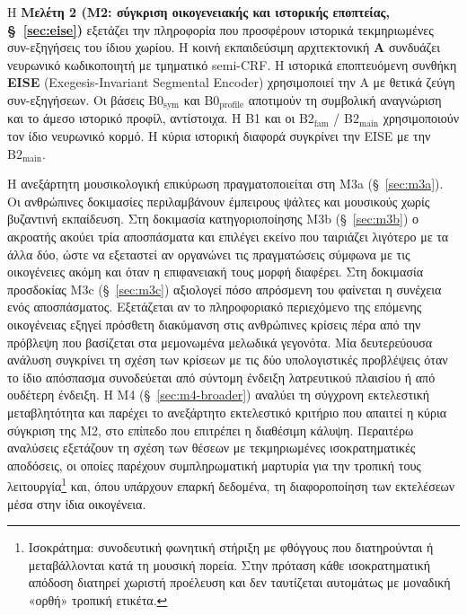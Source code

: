 \documentclass[11pt,a4paper]{article}
\begin{document}
Η \textbf{Μελέτη 2 (M2: σύγκριση οικογενειακής και ιστορικής εποπτείας, §~\ref{sec:eise})} εξετάζει την πληροφορία που προσφέρουν ιστορικά τεκμηριωμένες συν-εξηγήσεις του ίδιου χωρίου. Η κοινή εκπαιδεύσιμη αρχιτεκτονική \textbf{A} συνδυάζει νευρωνικό κωδικοποιητή με τμηματικό semi-CRF. Η ιστορικά εποπτευόμενη συνθήκη \textbf{EISE} (Exegesis-Invariant Segmental Encoder) χρησιμοποιεί την Α με θετικά ζεύγη συν-εξηγήσεων. Οι βάσεις $\mathrm{B0}_{\mathrm{sym}}$ και $\mathrm{B0}_{\mathrm{profile}}$ αποτιμούν τη συμβολική αναγνώριση και το άμεσο ιστορικό προφίλ, αντίστοιχα. Η B1 και οι $\mathrm{B2}_{\mathrm{fam}}$ / $\mathrm{B2}_{\mathrm{main}}$ χρησιμοποιούν τον ίδιο νευρωνικό κορμό. Η κύρια ιστορική διαφορά συγκρίνει την EISE με την $\mathrm{B2}_{\mathrm{main}}$.

Η ανεξάρτητη μουσικολογική επικύρωση πραγματοποιείται στη M3a (§~\ref{sec:m3a}). Οι ανθρώπινες δοκιμασίες περιλαμβάνουν έμπειρους ψάλτες και μουσικούς χωρίς βυζαντινή εκπαίδευση. Στη δοκιμασία κατηγοριοποίησης M3b (§~\ref{sec:m3b}) ο ακροατής ακούει τρία αποσπάσματα και επιλέγει εκείνο που ταιριάζει λιγότερο με τα άλλα δύο, ώστε να εξεταστεί αν οργανώνει τις πραγματώσεις σύμφωνα με τις οικογένειες ακόμη και όταν η επιφανειακή τους μορφή διαφέρει. Στη δοκιμασία προσδοκίας M3c (§~\ref{sec:m3c}) αξιολογεί πόσο απρόσμενη του φαίνεται η συνέχεια ενός αποσπάσματος. Εξετάζεται αν το πληροφοριακό περιεχόμενο της επόμενης οικογένειας εξηγεί πρόσθετη διακύμανση στις ανθρώπινες κρίσεις πέρα από την πρόβλεψη που βασίζεται στα μεμονωμένα μελωδικά γεγονότα. Μία δευτερεύουσα ανάλυση συγκρίνει τη σχέση των κρίσεων με τις δύο υπολογιστικές προβλέψεις όταν το ίδιο απόσπασμα συνοδεύεται από σύντομη ένδειξη λατρευτικού πλαισίου ή από ουδέτερη ένδειξη. Η M4 (§~\ref{sec:m4-broader}) αναλύει τη σύγχρονη εκτελεστική μεταβλητότητα και παρέχει το ανεξάρτητο εκτελεστικό κριτήριο που απαιτεί η κύρια σύγκριση της M2, στο επίπεδο που επιτρέπει η διαθέσιμη κάλυψη. Περαιτέρω αναλύσεις εξετάζουν τη σχέση των θέσεων με τεκμηριωμένες ισοκρατηματικές αποδόσεις, οι οποίες παρέχουν συμπληρωματική μαρτυρία για την τροπική τους λειτουργία\footnote{Ισοκράτημα: συνοδευτική φωνητική στήριξη με φθόγγους που διατηρούνται ή μεταβάλλονται κατά τη μουσική πορεία. Στην πρόταση κάθε ισοκρατηματική απόδοση διατηρεί χωριστή προέλευση και δεν ταυτίζεται αυτομάτως με μοναδική «ορθή» τροπική ετικέτα.} και, όπου υπάρχουν επαρκή δεδομένα, τη διαφοροποίηση των εκτελέσεων μέσα στην ίδια οικογένεια.
\end{document}
